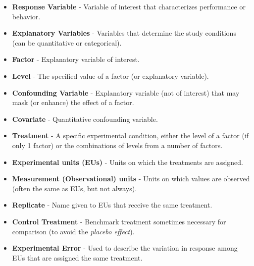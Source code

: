 \documentclass{report}
\begin{document}
\begin{itemize}
\item \textbf{Response Variable} - Variable of interest that characterizes performance or behavior.
\item \textbf{Explanatory Variables} - Variables that determine the study conditions (can be quantitative or categorical).
\item \textbf{Factor} - Explanatory variable of interest.
\item \textbf{Level} -	The specified value of a factor (or explanatory variable).
\item \textbf{Confounding Variable} - Explanatory variable (not of interest) that may mask (or enhance) the effect of a factor.
\item \textbf{Covariate} - Quantitative confounding variable.
\item \textbf{Treatment} - A specific experimental condition, either the level of a factor (if only 1 factor) or the combinations of levels from a number of factors.
\item \textbf{Experimental units (EUs)} - Units on which the treatments are assigned.
\item \textbf{Measurement (Observational) units} - Units on which values are observed (often the same as EUs, but not always).
\item \textbf{Replicate} - Name given to EUs that receive the same treatment.
\item \textbf{Control Treatment} - Benchmark treatment sometimes necessary for comparison (to avoid the \textit{placebo effect}).
\item \textbf{Experimental Error} - Used to describe the variation in response among EUs that are assigned the same treatment.
\end{itemize}
\end{document}
